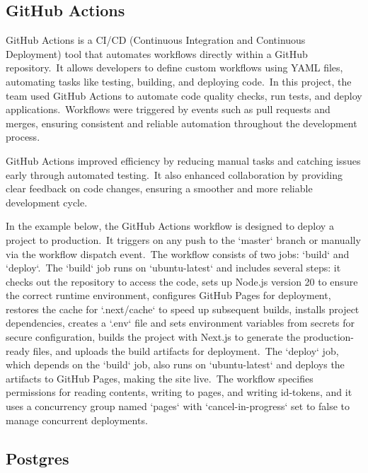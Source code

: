 \subsection{GitHub Actions}\label{subsec:github-actions}

GitHub Actions is a CI/CD (Continuous Integration and Continuous Deployment) tool that automates workflows directly within a GitHub repository.\ It allows developers to define custom workflows using YAML files, automating tasks like testing, building, and deploying code.\ In this project, the team used GitHub Actions to automate code quality checks, run tests, and deploy applications.\ Workflows were triggered by events such as pull requests and merges, ensuring consistent and reliable automation throughout the development process.\cite[GitHub Actions]{githubActions}

GitHub Actions improved efficiency by reducing manual tasks and catching issues early through automated testing.\ It also enhanced collaboration by providing clear feedback on code changes, ensuring a smoother and more reliable development cycle.

In the example below, the GitHub Actions workflow is designed to deploy a project to production.\ It triggers on any push to the `master` branch or manually via the workflow dispatch event.\ The workflow consists of two jobs: `build` and `deploy`.\ The `build` job runs on `ubuntu-latest` and includes several steps: it checks out the repository to access the code, sets up Node.js version 20 to ensure the correct runtime environment, configures GitHub Pages for deployment, restores the cache for `.next/cache` to speed up subsequent builds, installs project dependencies, creates a `.env` file and sets environment variables from secrets for secure configuration, builds the project with Next.js to generate the production-ready files, and uploads the build artifacts for deployment.\ The `deploy` job, which depends on the `build` job, also runs on `ubuntu-latest` and deploys the artifacts to GitHub Pages, making the site live.\ The workflow specifies permissions for reading contents, writing to pages, and writing id-tokens, and it uses a concurrency group named `pages` with `cancel-in-progress` set to false to manage concurrent deployments.



\subsection{Postgres}\label{subsec:postgres}

